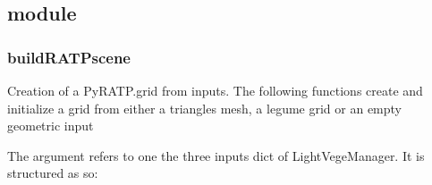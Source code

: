 \documentclass[letterpaper,10pt,english]{sphinxmanual}
\begin{document}
\begin{fulllineitems}
\end{fulllineitems}



\subsection{ module}
\label{\detokenize{reference:module-buildRATPscene}}\label{\detokenize{reference:buildratpscene-module}}

\subsubsection{buildRATPscene}
\label{\detokenize{reference:buildratpscene}}
\sphinxAtStartPar
Creation of a PyRATP.grid from inputs. The following functions create and initialize a grid from
either a triangles mesh, a l\sphinxhyphen{}egume grid or an empty geometric input

\sphinxAtStartPar
The argument  refers to one the three inputs dict of LightVegeManager. It is 
structured as so:
\end{document}
